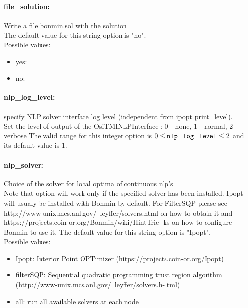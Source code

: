 \paragraph{file\_solution:}\label{sec:file_solution} Write a file bonmin.sol with the solution $\;$ \\

The default value for this string option is "no".
\\ 
Possible values:
\begin{itemize}
   \item yes: 
   \item no: 
\end{itemize}

\paragraph{nlp\_log\_level:}\label{sec:nlp_log_level} specify NLP solver interface log level (independent from ipopt print\_level). $\;$ \\
 Set the level of output of the OsiTMINLPInterface
: 0 - none, 1 - normal, 2 - verbose The valid range for this integer option is
$0 \le {\tt nlp\_log\_level } \le 2$
and its default value is $1$.


\paragraph{nlp\_solver:}\label{sec:nlp_solver} Choice of the solver for local optima of continuous nlp's $\;$ \\
 Note that option will work only if the specified
solver has been installed. Ipopt will usualy be
installed with Bonmin by default. For FilterSQP
please see
http://www-unix.mcs.anl.gov/~leyffer/solvers.html
on how to obtain it and
https://projects.coin-or.org/Bonmin/wiki/HintTric-
ks on how to configure Bonmin to use it.
The default value for this string option is "Ipopt".
\\ 
Possible values:
\begin{itemize}
   \item Ipopt: Interior Point OPTimizer
(https://projects.coin-or.org/Ipopt)
   \item filterSQP: Sequential quadratic programming trust region
algorithm
(http://www-unix.mcs.anl.gov/~leyffer/solvers.h-
tml)
   \item all: run all available solvers at each node
\end{itemize}

